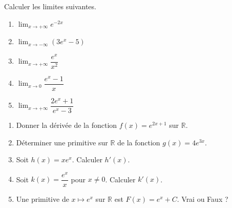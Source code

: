 \documentclass[11pt]{article}
\begin{document}
\begin{exercice}[Limites]
Calculer les limites suivantes.
\begin{enumerate}
    \item $\displaystyle\lim_{x \to +\infty} e^{-2x}$
    \item $\displaystyle\lim_{x \to -\infty} (3e^{x} - 5)$
    \item $\displaystyle\lim_{x \to +\infty} \dfrac{e^{x}}{x^{2}}$
    \item $\displaystyle\lim_{x \to 0} \dfrac{e^{x} - 1}{x}$
    \item $\displaystyle\lim_{x \to +\infty} \dfrac{2e^{x} + 1}{e^{x} - 3}$
\end{enumerate}
\end{exercice}

\begin{exercice}
\begin{enumerate}
    \item Donner la dérivée de la fonction $f(x) = e^{2x+1}$ sur $\mathbb{R}$.
    \item Déterminer une primitive sur $\mathbb{R}$ de la fonction $g(x) = 4e^{3x}$.
    \item Soit $h(x) = x e^{x}$. Calculer $h'(x)$.
    \item Soit $k(x) = \dfrac{e^{x}}{x}$ pour $x \neq 0$. Calculer $k'(x)$.
    \item Une primitive de $x \mapsto e^{x}$ sur $\mathbb{R}$ est $F(x) = e^{x} + C$. Vrai ou Faux ?
\end{enumerate}
\end{exercice}
\end{document}
